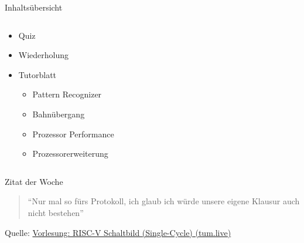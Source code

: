 \documentclass[
  german,            %
  aspectratio=169,    %
]{tumbeamer}
\begin{document}
\begin{frame}[c]{Inhaltsübersicht}{}
  \begin{columns}[c]
    \begin{column}{1\textwidth}
      \begin{itemize}
        \item Quiz
        \item Wiederholung
        \item Tutorblatt
        \begin{itemize}
          \item Pattern Recognizer
          \item Bahnübergang
          \item Prozessor Performance
          \item Prozessorerweiterung
        \end{itemize}
      \end{itemize}
    \end{column}
  \end{columns}
\end{frame}

\begin{frame}[c, fragile]{}{}
  \begin{center}
    \vspace{0.5cm}
    \begin{block}{Zitat der Woche}
      \vspace{0.5cm}
      \begin{quote}
        \enquote{Nur mal so fürs Protokoll, ich glaub ich würde unsere eigene Klausur auch nicht bestehen}
        \vspace{0.5cm}
      \end{quote}
      \vspace{0.5cm}
    \end{block}
    \vspace{0.5cm}
    Quelle: \href{https://tum.live/w/ws24EidR/50026?t=5585}{Vorlesung: RISC-V Schaltbild (Single-Cycle) (tum.live)}
  \end{center}
\end{frame}
\end{document}
